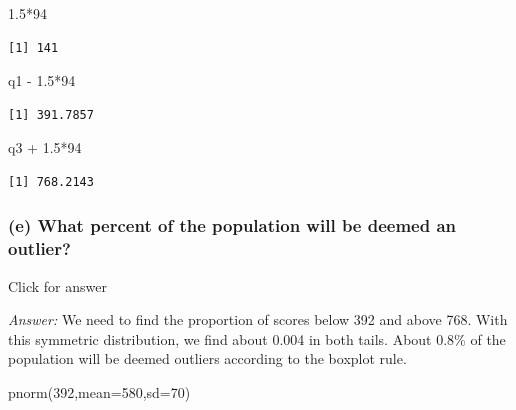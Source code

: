 \documentclass[
]{book}
\newenvironment{Shaded}{\begin{snugshade}}{\end{snugshade}}
\newcommand{\AttributeTok}[1]{\textcolor[rgb]{0.77,0.63,0.00}{#1}}
\newcommand{\DecValTok}[1]{\textcolor[rgb]{0.00,0.00,0.81}{#1}}
\newcommand{\FloatTok}[1]{\textcolor[rgb]{0.00,0.00,0.81}{#1}}
\newcommand{\FunctionTok}[1]{\textcolor[rgb]{0.00,0.00,0.00}{#1}}
\newcommand{\NormalTok}[1]{#1}
\newcommand{\SpecialCharTok}[1]{\textcolor[rgb]{0.00,0.00,0.00}{#1}}
\begin{document}
\begin{Shaded}
\begin{Highlighting}[]
\FloatTok{1.5}\SpecialCharTok{*}\DecValTok{94}
\end{Highlighting}
\end{Shaded}

\begin{verbatim}
[1] 141
\end{verbatim}

\begin{Shaded}
\begin{Highlighting}[]
\NormalTok{q1 }\SpecialCharTok{{-}} \FloatTok{1.5}\SpecialCharTok{*}\DecValTok{94}
\end{Highlighting}
\end{Shaded}

\begin{verbatim}
[1] 391.7857
\end{verbatim}

\begin{Shaded}
\begin{Highlighting}[]
\NormalTok{q3 }\SpecialCharTok{+} \FloatTok{1.5}\SpecialCharTok{*}\DecValTok{94}
\end{Highlighting}
\end{Shaded}

\begin{verbatim}
[1] 768.2143
\end{verbatim}

\hypertarget{e-what-percent-of-the-population-will-be-deemed-an-outlier}{%
\subsubsection{(e) What percent of the population will be deemed an outlier?}\label{e-what-percent-of-the-population-will-be-deemed-an-outlier}}

Click for answer

\emph{Answer:} We need to find the proportion of scores below 392 and above 768. With this symmetric distribution, we find about 0.004 in both tails. About 0.8\% of the population will be deemed outliers according to the boxplot rule.

\begin{Shaded}
\begin{Highlighting}[]
\FunctionTok{pnorm}\NormalTok{(}\DecValTok{392}\NormalTok{,}\AttributeTok{mean=}\DecValTok{580}\NormalTok{,}\AttributeTok{sd=}\DecValTok{70}\NormalTok{)}
\end{Highlighting}
\end{Shaded}
\end{document}
